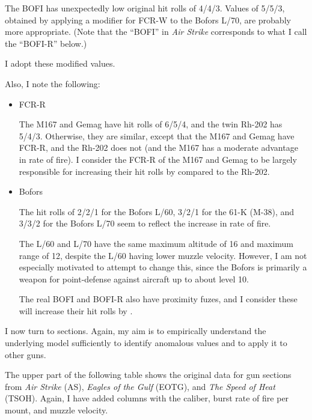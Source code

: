{\begin{itemize}
            The BOFI has unexpectedly low original hit rolls of 4/4/3. Values of 5/5/3, obtained by applying a  modifier for FCR-W to the Bofors L/70, are probably more appropriate. (Note that the “BOFI” in \emph{Air Strike} corresponds to what I call the “BOFI-R” below.)

    \end{itemize}

    I adopt these modified values.

    Also, I note the following:

    \begin{itemize}

        \item FCR-R

            The M167 and Gemag have hit rolls of 6/5/4, and the twin Rh-202 has 5/4/3. Otherwise, they are similar, except that the M167 and Gemag have FCR-R, and the Rh-202 does not (and the M167 has a moderate advantage in rate of fire). I consider the FCR-R of the M167 and Gemag to be largely responsible for increasing their hit rolls by  compared to the Rh-202.

        \item Bofors

            The hit rolls of 2/2/1 for the Bofors L/60, 3/2/1 for the 61-K (M-38), and 3/3/2 for the Bofors L/70 seem to reflect the increase in rate of fire.

            The L/60 and L/70 have the same maximum altitude of 16 and maximum range of 12, despite the L/60 having lower muzzle velocity. However, I am not especially motivated to attempt to change this, since the Bofors is primarily a weapon for point-defense against aircraft up to about level 10.

            The real BOFI and BOFI-R also have proximity fuzes, and I consider these will increase their hit rolls by .

    \end{itemize}

     I now turn to sections. Again, my aim is to empirically understand the underlying model sufficiently to identify anomalous values and to apply it to other guns.

    The upper part of the following table shows the original data for gun sections from \emph{Air Strike} (AS), \emph{Eagles of the Gulf} (EOTG), and \emph{The Speed of Heat} (TSOH). Again, I have added columns with the caliber, burst rate of fire per mount, and muzzle velocity.

}
